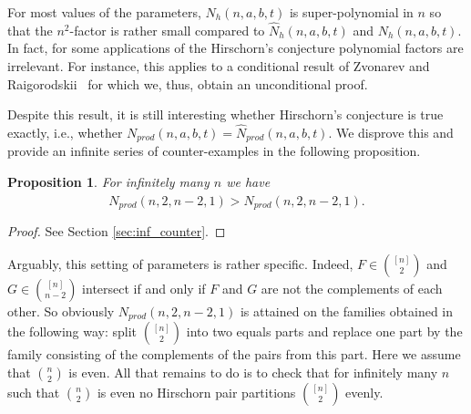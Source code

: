 \documentclass[12pt]{article}
\newtheorem{proposition}[theorem]{Proposition}
\begin{document}
For most values of the parameters, 
$N_h(n,a,b,t)$ is super-polynomial in $n$ so that the $n^2$-factor is rather small compared to $\widehat{N}_h(n,a,b,t)$ and $N_h(n,a,b,t)$. In fact, for some applications of the Hirschorn's
conjecture polynomial factors are irrelevant. For instance, this applies to a conditional result of Zvonarev and Raigorodskii~\cite[Theorem 3]{ZR15} for which we, thus, obtain an unconditional proof. 



Despite this result, it is still interesting whether Hirschorn's conjecture is true exactly, i.e., whether $N_{prod}(n,a,b,t) = \widehat{N}_{prod}(n,a,b,t)$. We disprove this and provide an infinite series of counter-examples in the following proposition.

\begin{proposition}
\label{inf_counter}
For infinitely many $n$ we have $$N_{prod}(n, 2, n - 2, 1) > \widehat{N}_{prod}(n,2,n - 2,1).$$
\end{proposition}
\begin{proof}
See Section \ref{sec:inf_counter}.
\end{proof}
Arguably, this setting of parameters is rather specific. Indeed, $F\in\binom{[n]}{2}$ and $G\in\binom{[n]}{n - 2}$ intersect if and only if $F$ and $G$ are not the complements of each other. 
So obviously  $N_{prod}(n, 2, n - 2, 1)$ is attained on the families obtained in the following way:  split $\binom{[n]}{2}$ into two equals parts and replace one  part by the family consisting of  the complements of the pairs from  this part. 
Here we assume that $\binom{n}{2}$ is even.  All that remains to do is to check that for infinitely many $n$ such that $\binom{n}{2}$ is even no Hirschorn pair partitions $\binom{[n]}{2}$ evenly.
\end{document}
